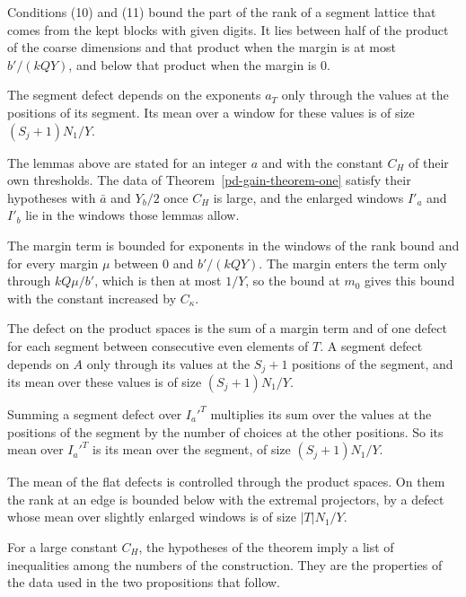 Conditions (10) and (11) bound the part of the rank of a segment lattice that comes from the kept
blocks with given digits. It lies between half of the product of the coarse dimensions and that product
when the margin is at most $b'/(kQY)$, and below that product when the margin is $0$.

The segment defect depends on the exponents $a_T$ only through the values at the positions of its
segment. Its mean over a window for these values is of size $(S_j+1)N_1/Y$.

The lemmas above are stated for an integer $a$ and with the constant $C_H$ of their own thresholds. The
data of Theorem~\ref{pd-gain-theorem-one} satisfy their hypotheses with $\bar a$ and $Y_b/2$ once $C_H$
is large, and the enlarged windows $I'_a$ and $I'_b$ lie in the windows those lemmas allow.

The margin term is bounded for exponents in the windows of the rank bound and for every margin $\mu$
between $0$ and $b'/(kQY)$. The margin enters the term only through $kQ\mu/b'$, which is then at most
$1/Y$, so the bound at $m_0$ gives this bound with the constant increased by $C_\kappa$.

The defect on the product spaces is the sum of a margin term and of one defect for each segment
between consecutive even elements of $T$. A segment defect depends on $A$ only through its values at
the $S_j+1$ positions of the segment, and its mean over these values is of size $(S_j+1)N_1/Y$.

Summing a segment defect over $I_a'^T$ multiplies its sum over the values at the positions of the
segment by the number of choices at the other positions. So its mean over $I_a'^T$ is its mean over
the segment, of size $(S_j+1)N_1/Y$.

The mean of the flat defects is controlled through the product spaces. On them the rank at an edge
is bounded below with the extremal projectors, by a defect whose mean over slightly enlarged windows
is of size $|T|N_1/Y$.

For a large constant $C_H$, the hypotheses of the theorem imply a list of inequalities among the
numbers of the construction. They are the properties of the data used in the two propositions that
follow.

